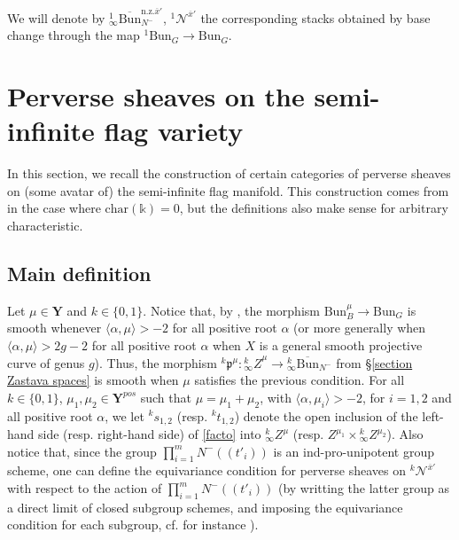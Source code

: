 \documentclass[11pt]{amsart}
\theoremstyle{plain}
\theoremstyle{remark}
\numberwithin{equation}{section}
\begin{document}
	We will denote by $^1_\infty\overline{\mathrm{Bun}}_{N^-}^{\mathrm{n.z.}\overline{x}'}$, $^1\mathcal{N}^{\overline{x}'}$ the corresponding stacks obtained by base change through the map $^1\mathrm{Bun}_G\to \mathrm{Bun}_G$.
	
	\section{Perverse sheaves on the semi-infinite flag variety}\label{section Perverse sheaves on the semi-infinite flag variety}
	In this section, we recall the construction of certain categories of perverse sheaves on (some avatar of) the semi-infinite flag manifold. This construction comes from \cite{ABBGM} in the case where $\mathrm{char}(\mathbb{k})=0$, but the definitions also make sense for arbitrary characteristic.
	\subsection{Main definition}\label{section Main definition}
	Let $\mu\in\mathbf{Y}$ and $k\in\{0,1\}$. Notice that, by \cite[Lemma 3.7]{BBGM}, the morphism $\mathrm{Bun}_B^\mu\to \mathrm{Bun}_G$ is smooth whenever $\langle\alpha,\mu\rangle>-2$ for all positive root $\alpha$ (or more generally when $\langle\alpha,\mu\rangle>2g-2$ for all positive root $\alpha$ when $X$ is a general smooth projective curve of genus $g$). Thus,  the morphism $^k\mathfrak{p}^\mu:{_\infty ^kZ}^\mu\to {_\infty^k\overline{\mathrm{Bun}}_{N^-}}$ from §\ref{section Zastava spaces} is smooth when $\mu$ satisfies the previous condition.  For all $k\in\{0,1\}$, $\mu_1,\mu_2\in \mathbf{Y}^{pos}$ such that $\mu=\mu_1+\mu_2$, with $\langle\alpha,\mu_i\rangle>-2$, for $i=1,2$ and all positive root $\alpha$, we let $^ks_{1,2}$ (resp. $^kt_{1,2}$) denote the open inclusion of the left-hand side (resp. right-hand side) of \eqref{facto} into $^k_\infty Z^\mu$ (resp. $Z^{\mu_1}\times {^k_\infty Z^{\mu_2}}$). Also notice that, since the group $\prod_{i=1}^mN^-((t'_i))$ is an ind-pro-unipotent group scheme, one can define the equivariance condition for perverse sheaves on $^k\mathcal{N}^{\overline{x}'}$ with respect to the action of $\prod_{i=1}^mN^-((t'_i))$ (by writting the latter group as a direct limit of closed subgroup schemes, and imposing the equivariance condition for each subgroup, cf. for instance \cite[§1.2.1]{GAITSGORY2018789}). 
	
\end{document}
